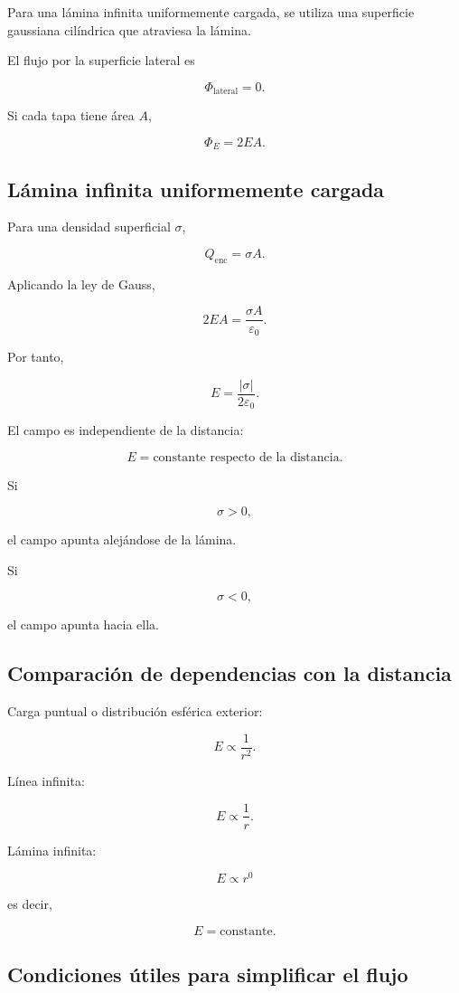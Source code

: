 Para una lámina infinita uniformemente cargada, se utiliza una superficie
gaussiana cilíndrica que atraviesa la lámina.

El flujo por la superficie lateral es

\[
\boxed{\Phi_{\text{lateral}}=0}.
\]

Si cada tapa tiene área \(A\),

\[
\boxed{\Phi_E=2EA}.
\]


\subsection{Lámina infinita uniformemente cargada}

Para una densidad superficial \(\sigma\),

\[
\boxed{
Q_{\text{enc}}=\sigma A
}.
\]

Aplicando la ley de Gauss,

\[
2EA=\frac{\sigma A}{\varepsilon_0}.
\]

Por tanto,

\[
\boxed{
E=\frac{|\sigma|}{2\varepsilon_0}
}.
\]

El campo es independiente de la distancia:

\[
\boxed{E=\text{constante respecto de la distancia}}.
\]

Si

\[
\sigma>0,
\]

el campo apunta alejándose de la lámina.

Si

\[
\sigma<0,
\]

el campo apunta hacia ella.


\subsection{Comparación de dependencias con la distancia}

Carga puntual o distribución esférica exterior:

\[
\boxed{
E\propto\frac{1}{r^2}
}.
\]

Línea infinita:

\[
\boxed{
E\propto\frac{1}{r}
}.
\]

Lámina infinita:

\[
\boxed{
E\propto r^0
}
\]

es decir,

\[
\boxed{E=\text{constante}}.
\]


\subsection{Condiciones útiles para simplificar el flujo}

